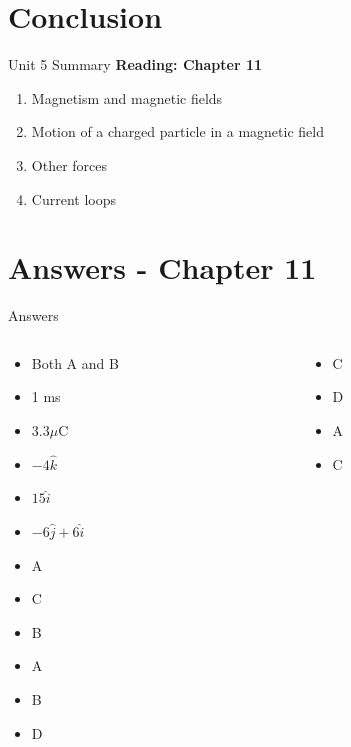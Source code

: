 \documentclass{beamer}
\begin{document}
\section{Conclusion}

\begin{frame}{Unit 5 Summary}
\textbf{Reading: Chapter 11}
\begin{enumerate}
\item Magnetism and magnetic fields
\item \alert{Motion of a charged particle in a magnetic field}
\item Other forces
\item Current loops
\end{enumerate}
\end{frame}

\section{Answers - Chapter 11}

\begin{frame}{Answers}
\small
\begin{columns}[T]
\begin{column}{0.5\textwidth}
\begin{itemize}
\item Both A and B
\item 1 ms
\item $3.3 \mu$C
\item $-4\hat{k}$
\item $15\hat{i}$
\item $-6\hat{j}+6\hat{i}$
\item A
\item C
\item B
\item A
\item B
\item D
\end{itemize}
\end{column}
\begin{column}{0.5\textwidth}
\begin{itemize}
\item C
\item D
\item A
\item C
\end{itemize}
\end{column}
\end{columns}
\end{frame}
\end{document}
